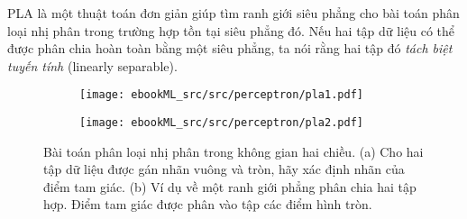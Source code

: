 PLA là một thuật toán đơn giản giúp tìm ranh giới siêu phẳng cho bài toán phân loại nhị phân trong trường hợp tồn tại siêu phẳng đó. Nếu hai tập dữ liệu có thể được phân chia hoàn toàn bằng một siêu phẳng, ta nói rằng hai tập đó \textit{tách biệt tuyến tính} ({linearly separable}).



\begin{figure}[t]
\begin{subfigure}{0.49\textwidth}
\texttt{[image: ebookML\_src/src/perceptron/pla1.pdf]}
\caption{}
\label{fig:9_1a}
\end{subfigure}
\begin{subfigure}{0.49\textwidth}
\texttt{[image: ebookML\_src/src/perceptron/pla2.pdf]}
\caption{}
\label{fig:9_1b}
\end{subfigure}
\caption{
Bài toán phân loại nhị phân trong không gian hai chiều. (a) Cho hai tập dữ liệu được gán nhãn vuông và tròn, hãy xác định nhãn của điểm tam giác. (b) Ví dụ về một ranh giới phẳng phân chia hai tập hợp. Điểm tam giác được phân vào tập các điểm hình tròn.
}
\label{fig:9_1}
\end{figure}














